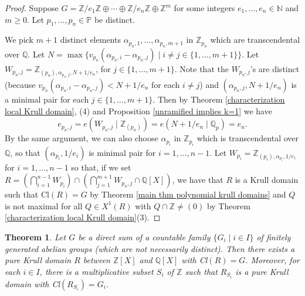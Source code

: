 \documentclass[10pt]{article}
\numberwithin{equation}{section}
\newtheorem{Thm}[equation]{Theorem}
\theoremstyle{definition}
\theoremstyle{definition}
\newcommand{\Q}{\mathbb{Q}}
\newcommand{\N}{\mathbb{N}}
\newcommand{\Z}{\mathbb{Z}}
\newcommand{\PP}{\mathbb{P}}
\begin{document}
\begin{proof}
Suppose $G=\Z/e_1\Z \oplus \cdots \oplus \Z/e_n\Z \oplus \Z^m$
for some integers $e_1, \dots , e_n \in \N$ and $m \geq 0$. 
Let $p_1, \dots , p_n \in \PP$ be distinct. 

We pick $m+1$ distinct elements $\alpha_{p_n, 1},\ldots,\alpha_{p_n, m+1}$ in $\Z_{p_n}$ which are transcendental over $\Q$.  Let $N=\max\{v_{p_n}(\alpha_{p_n,i}-\alpha_{p_n, j})\mid i\not=j\in\{1,\ldots,m+1\}\}$. 
Let $W_{p_n, j} = \Z_{(p_n),\alpha_{p_n, j}, N+1/e_n}$, for $j\in\{1,\ldots,m +1\}$.  Note that the $W_{p_n,j}$'s are distinct (because $v_{p_n}(\alpha_{p_n, i}-\alpha_{p_n,j})<N+1/e_n$ for each 
$i\not=j$) and $(\alpha_{p_n,j}, N+ 1/e_n)$ is a minimal pair for each 
$j\in\{1,\ldots,m+1\}$. Then by Theorem \ref{characterization local Krull domain}, (4) and Proposition \ref{unramified implies k=1} we have 
 $$e_{p_n,j}=e(W_{p_n,j}\mid\Z_{(p_n)})=e(N+1/e_n\mid\Q_p)=e_n.$$
By the same argument, we can also choose $\alpha_{p_i}$ in $\Z_{p_i}$
which is transcendental over $\Q$, so that $(\alpha_{p_i}, 1/e_i)$ is minimal pair for $i=1, \dots, n-1$. Let $W_{p_i} = \Z_{(p_i), \alpha_{p_i}, 1/e_i}$ for $i =1, \dots, n-1$  so that, if we set $R= (\bigcap\limits_{i=1}^{n-1}W_{p_i}) \cap (\bigcap\limits_{j=1}^{m+1}W_{p_n,j}\cap\Q[X])$, 
we have that $R$ is a Krull domain such that Cl$(R)=G$
by Theorem \ref{main thm polynomial krull domains}
and $Q$ is not maximal for all $Q \in X^1(R)$ with $Q \cap \Z \neq (0)$
by Theorem \ref{characterization local Krull domain}(3).
\end{proof}

 
\begin{Thm}
Let $G$ be a direct sum of a countable family $\{G_i \mid i \in I\}$ of finitely generated abelian groups (which are not necessarily distinct).
Then there exists a pure Krull domain $R$ between $\Z[X]$ and $\Q[X]$ with Cl$(R)=G$. Moreover, for each $i \in I$, there is a multiplicative subset $S_i$ of $\Z$ such that $R_{S_i}$ is a pure Krull domain with Cl$(R_{S_i}) = G_i$.  
\end{Thm}
\end{document}
